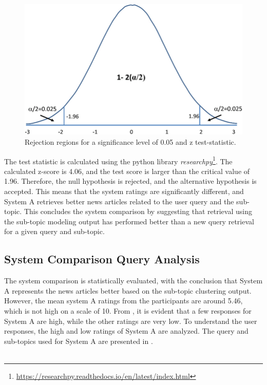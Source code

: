 \begin{figure}[h]
	\centering
	\includegraphics[width=.75\textwidth]{images/outside/z_score.PNG}
	\caption[Rejection regions for z test-statistic.]{Rejection regions for a significance level of 0.05 and z test-statistic. \cite{article} \label{fig:z_score}}
\end{figure}



The test statistic is calculated using the python library \textit{researchpy}\footnote{\url{https://researchpy.readthedocs.io/en/latest/index.html}}. The calculated z-score is 4.06, and the test score is larger than the critical value of 1.96. Therefore, the null hypothesis is rejected, and the alternative hypothesis is accepted. This means that the system ratings are significantly different, and System A retrieves better news articles related to the user query and the sub-topic. This concludes the system comparison by suggesting that retrieval using the sub-topic modeling output has performed better than a new query retrieval for a given query and sub-topic.

\subsection{System Comparison Query Analysis}

The system comparison is statistically evaluated, with the conclusion that System A represents the news articles better based on the sub-topic clustering output. However, the mean system A ratings from the participants are around 5.46, which is not high on a scale of 10. From , it is evident that a few responses for System A are high, while the other ratings are very low. To understand the user responses, the high and low ratings of System A are analyzed. The query and sub-topics used for System A are presented in .\\
\\

